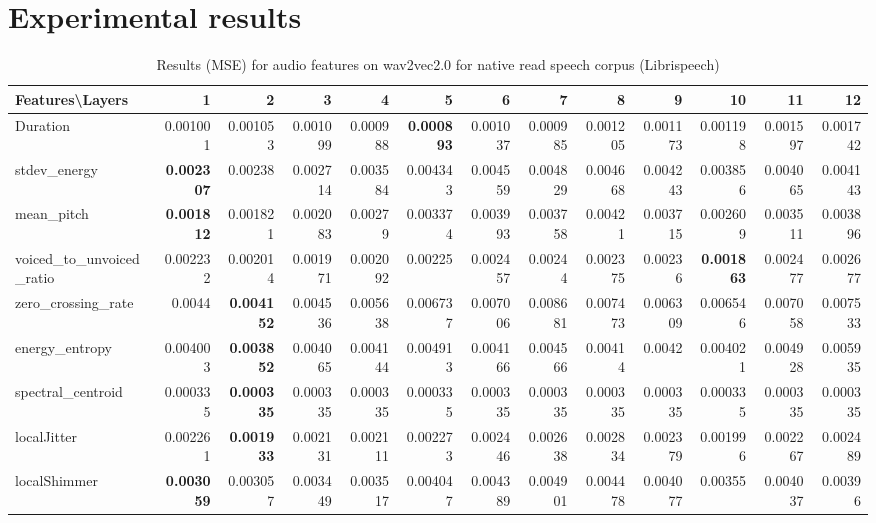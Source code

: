 \documentclass[sigconf]{acmart}
\begin{document}



\appendix

\section{Experimental results}
\begin{table*}[!htbp]
\begin{adjustbox}{width=1\textwidth}
\begin{tabular}{@{}l|rrrrrrrrrrrr@{}}
\toprule
\textbf{Features\textbackslash  Layers} & 1 & 2 & 3 & 4 & 5 & 6 & 7 & 8 & 9 & 10 & 11 & 12 \\ \midrule
Duration & 0.001001 & 0.001053 & 0.001099 & 0.000988 & \textbf{0.000893} & 0.001037 & 0.000985 & 0.001205 & 0.001173 & 0.001198 & 0.001597 & 0.001742 \\
stdev\_energy & \textbf{0.002307} & 0.00238 & 0.002714 & 0.003584 & 0.004343 & 0.004559 & 0.004829 & 0.004668 & 0.004243 & 0.003856 & 0.004065 & 0.004143 \\
mean\_pitch & \textbf{0.001812} & 0.001821 & 0.002083 & 0.00279 & 0.003374 & 0.003993 & 0.003758 & 0.00421 & 0.003715 & 0.002609 & 0.003511 & 0.003896 \\
voiced\_to\_unvoiced\_ratio & 0.002232 & 0.002014 & 0.001971 & 0.002092 & 0.00225 & 0.002457 & 0.00244 & 0.002375 & 0.00236 & \textbf{0.001863} & 0.002477 & 0.002677 \\
zero\_crossing\_rate & 0.0044 & \textbf{0.004152} & 0.004536 & 0.005638 & 0.006737 & 0.007006 & 0.008681 & 0.007473 & 0.006309 & 0.006546 & 0.007058 & 0.007533 \\
energy\_entropy & 0.004003 & \textbf{0.003852} & 0.004065 & 0.004144 & 0.004913 & 0.004166 & 0.004566 & 0.00414 & 0.0042 & 0.004021 & 0.004928 & 0.005935 \\
spectral\_centroid & 0.000335 & \textbf{0.000335} & 0.000335 & 0.000335 & 0.000335 & 0.000335 & 0.000335 & 0.000335 & 0.000335 & 0.000335 & 0.000335 & 0.000335 \\
localJitter & 0.002261 & \textbf{0.001933} & 0.002131 & 0.002111 & 0.002273 & 0.002446 & 0.002638 & 0.002834 & 0.002379 & 0.001996 & 0.002267 & 0.002489 \\
localShimmer & \textbf{0.003059} & 0.003057 & 0.003449 & 0.003517 & 0.004047 & 0.004389 & 0.004901 & 0.004478 & 0.004077 & 0.00355 & 0.004037 & 0.00396 \\ \bottomrule
\end{tabular}
\end{adjustbox}
\vspace{1 mm}
\caption{\label{Audio_W}  \small Results (MSE) for audio features on wav2vec2.0 for native read speech corpus (Librispeech) %
}
\vspace{-3 mm}
\end{table*}
\end{document}
